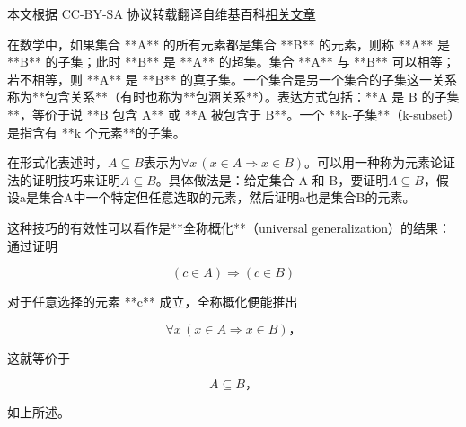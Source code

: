 
本文根据 CC-BY-SA 协议转载翻译自维基百科\href{https://en.wikipedia.org/wiki/Subset}{相关文章}

在数学中，如果集合 **A** 的所有元素都是集合 **B** 的元素，则称 **A** 是 **B** 的子集；此时 **B** 是 **A** 的超集。集合 **A** 与 **B** 可以相等；若不相等，则 **A** 是 **B** 的真子集。一个集合是另一个集合的子集这一关系称为**包含关系**（有时也称为**包涵关系**）。表达方式包括：**A 是 B 的子集**，等价于说 **B 包含 A** 或 **A 被包含于 B**。一个 **k-子集**（k-subset）是指含有 **k 个元素**的子集。

在形式化表述时，$A \subseteq B$表示为$\forall x \,(x \in A\Rightarrow x \in B)$。可以用一种称为元素论证法的证明技巧来证明$A \subseteq B$。具体做法是：给定集合 A 和 B，要证明$A \subseteq B$，假设a是集合A中一个特定但任意选取的元素，然后证明a也是集合B的元素。

这种技巧的有效性可以看作是**全称概化**（universal generalization）的结果：通过证明

$$
(c \in A) \Rightarrow (c \in B)
$$

对于任意选择的元素 **c** 成立，全称概化便能推出

$$
\forall x \,(x \in A \Rightarrow x \in B)，
$$

这就等价于

$$
A \subseteq B，
$$

如上所述。
